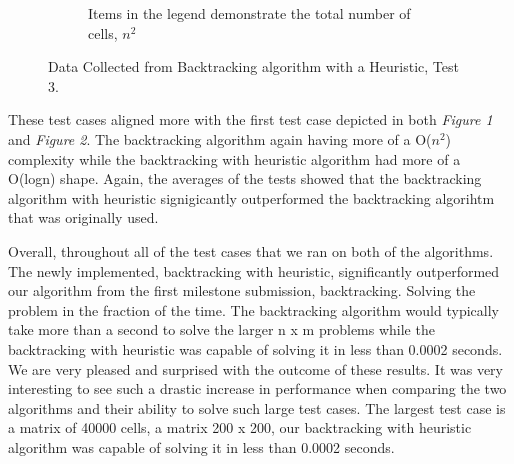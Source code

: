 \documentclass{article}
\begin{document}
\begin{figure}[!h]
\begin{subfigure}{0.4\textwidth}
		\label{Test 3: Scatter plot of all collected points}
		\caption{Items in the legend demonstrate the total number of cells, $n^2$}
	\end{subfigure}
	\caption{Data Collected from Backtracking algorithm with a Heuristic, Test 3.}
\end{figure}

\bigskip



These test cases aligned more with the first test case depicted in both \textit{Figure 1} and \textit{Figure 2}. The
backtracking algorithm again having more of a O($n^2$) complexity while the
backtracking with heuristic algorithm had more of a O(logn) shape. Again, 
the averages of the tests showed that the backtracking algorithm with heuristic
signigicantly outperformed the backtracking algorihtm that was originally used.

\bigskip

Overall, throughout all of the test cases that we ran on both of the algorithms. 
The newly implemented, backtracking with heuristic, significantly outperformed 
our algorithm from the first milestone submission, backtracking. Solving the problem in the 
fraction of the time. The backtracking algorithm would typically take more than a second
to solve the larger n x m problems while the backtracking with heuristic was capable of
solving it in less than 0.0002 seconds. We are very pleased and surprised with the outcome
of these results. It was very interesting to see such a drastic increase in performance 
when comparing the two algorithms and their ability to solve such large test cases. The largest
test case is a matrix of 40000 cells, a matrix 200 x 200, our backtracking with heuristic algorithm was capable
of solving it in less than 0.0002 seconds.







\end{document}
